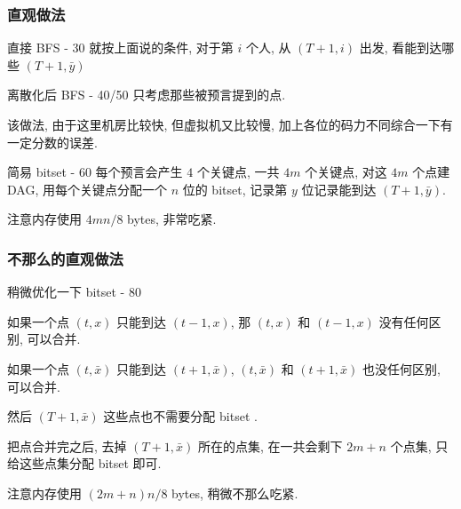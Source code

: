 \documentclass{beamer}
\begin{document}

\begin{frame}
\frametitle{直观做法}
\begin{block}{直接 BFS - 30}
就按上面说的条件, 对于第 $i$ 个人, 从 $(T + 1, i)$ 出发, 看能到达哪些 $(T+1, \bar{y})$
\end{block}

\begin{block}{离散化后 BFS - 40/50}
只考虑那些被预言提到的点. 

该做法, 由于这里机房比较快, 但虚拟机又比较慢, 加上各位的码力不同综合一下有一定分数的误差. 
\end{block}

\begin{block}{简易 bitset - 60}
每个预言会产生 $4$ 个关键点, 一共 $4m$ 个关键点, 对这 $4m$ 个点建 DAG, 用每个关键点分配一个 $n$ 位的 bitset, 
记录第 $y$ 位记录能到达 $(T+1, \bar{y})$. 

注意内存使用 $4mn/8$ bytes, 非常吃紧. 
\end{block}
\end{frame}

\begin{frame}
\frametitle{不那么的直观做法}
\begin{block}{稍微优化一下 bitset - 80}

如果一个点 $(t, x)$ 只能到达 $(t - 1, x)$, 那 $(t, x)$ 和 $(t-1, x)$ 没有任何区别, 可以合并. 

如果一个点 $(t, \bar{x})$ 只能到达 $(t+1, \bar{x})$, $(t, \bar{x})$ 和 $(t+1, \bar{x})$ 也没任何区别, 可以合并. 

然后 $(T+1, \bar{x})$ 这些点也不需要分配 bitset .

把点合并完之后, 去掉 $(T+1, \bar{x})$ 所在的点集, 在一共会剩下 $2m+n$ 个点集, 只给这些点集分配 bitset 即可.  

注意内存使用 $(2m+n)n/8$ bytes, 稍微不那么吃紧. 
\end{block}


\end{frame}
\end{document}
